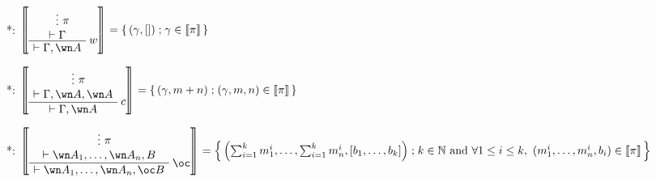 *: \(\sem{
\AxRule{}
\VdotsRule{ \pi }{ \vdash \Gamma }
\LabelRule{ w }
\UnaRule{ \vdash \Gamma, \wn A }
\DisplayProof} =  \set{(\gamma,[])}{\gamma\in\sem\pi}\)

*: \(\sem{
\AxRule{}
\VdotsRule{ \pi }{ \vdash \Gamma, \wn A, \wn A }
\LabelRule{ c }
\UnaRule{ \vdash \Gamma, \wn A }
\DisplayProof} =  \set{(\gamma,m+n)}{(\gamma,m,n)\in\sem\pi}\)

*: \(\sem{
\AxRule{}
\VdotsRule{ \pi }{ \vdash \wn A_1,\ldots,\wn A_n,B }
\LabelRule{ \oc }
\UnaRule{ \vdash \wn A_1,\ldots,\wn A_n,\oc B }
\DisplayProof} = \set{
\left(\sum_{i=1}^k m_1^i,\ldots,\sum_{i=1}^k m_n^i,[b_1,\ldots,b_k]\right)}
{k \in \mathbb{N} \ \text{and} \ \forall 1 \leq i \leq k,\ (m_1^i,\ldots,m_n^i,b_i)\in\sem\pi}\)

